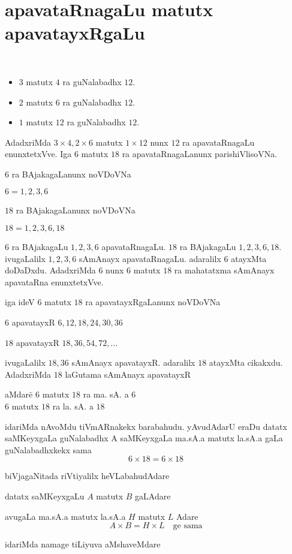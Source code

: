 \chapter{apavataRnagaLu matutx apavatayxRgaLu}
\vskip -2cm
~

\begin{itemize}
\itemsep=0pt
\item[{\rm }] $3$ matutx $4$ ra guNalabadhx $12$.
\item[{\rm }]$2$ matutx $6$ ra guNalabadhx $12$.
\item[{\rm }]$1$ matutx $12$ ra guNalabadhx $12$.
\end{itemize}
AdadxriMda $3\times4, 2\times 6 $ matutx $1\times 12$ nunx $12$ ra apavataRnagaLu enunxtetxVve. Iga $6$ matutx $18$ ra apavataRnagaLanunx parishiVlisoVNa. 

$6$ ra BAjakagaLanunx noVDoVNa

$6=1,2,3,6$ 

$18$ ra BAjakagaLanunx noVDoVNa

$18=1,2,3,6,18$

$6$ ra BAjakagaLu $1,2,3,6$ apavataRnagaLu. $18$ ra BAjakagaLu $1,2,3,6,18$. ivugaLalilx $1,2,3,6$ sAmAnayx apavataRnagaLu. adaralilx $6$ atayxMta doDaDxdu. AdadxriMda $6$ nunx $6$ matutx $18$ ra mahatatxma sAmAnayx apavataRna enunxtetxVve. 

iga ideV $6$ matutx $18$ ra apavatayxRgaLanunx noVDoVNa 

$6$ apavatayxR $6,12,18,24,30,36$

$18$ apavatayxR $18,36,54,72,\ldots$

ivugaLalilx $18, 36$ sAmAnayx apavatayxR. adaralilx $18$ atayxMta cikakxdu. AdadxriMda $18$ laGutama sAmAnayx apavatayxR
\begin{tabbing}
aMdare\qquad \= $6$ matutx $18$ ra ma. sA. a $6$\\
\> $6$ matutx $18$ ra la. sA. a $18$
\end{tabbing}
idariMda nAvoMdu tiVmARnakekx barabahudu. yAvudAdarU eraDu datatx saMKeyxgaLa guNalabadhx A saMKeyxgaLa ma.sA.a matutx la.sA.a gaLa guNalabadhxkekx sama
$$
6\times 18 = 6 \times 18
$$

biVjagaNitada riVtiyalilx heVLabahudAdare

datatx saMKeyxgaLu $A$ matutx $B$ gaLAdare

avugaLa ma.sA.a matutx la.sA.a  $H$ matutx $L$ Adare
$$
A\times B = H\times L \quad \text{ge sama}
$$

idariMda namage tiLiyuva aMshaveMdare

